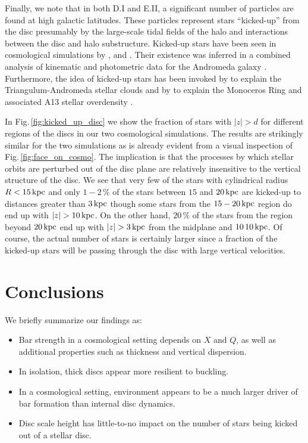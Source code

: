 Finally, we note that in both D.I and E.II, a significant number of
particles are found at high galactic latitudes.  These particles
represent stars ``kicked-up'' from the disc presumably by the
large-scale tidal fields of the halo and interactions between the disc
and halo substructure.  Kicked-up stars have been seen in cosmological
simulations by \citet{purcell2010}, \citet{mccarthy2012} and
\citet{tissera2013}.  Their existence was inferred in a combined
analysis of kinematic and photometric data for the Andromeda galaxy
\citep{dorman2013}.  Furthermore, the idea of kicked-up stars has been
invoked by \citep{pricewhelan2015} to explain the Triangulum-Andromeda
stellar clouds \citep{rochapinto2003, martin2014} and by
\citep{sheffield2018, laporte_2018_low_latitude} to explain the Monoceros Ring \citep{yanny2000,
  newberg_2002} and associated A13 stellar overdensity
\citep{sharma2010}.

In Fig.\,\ref{fig:kicked_up_disc} we show the fraction of stars with
$|z|>d$ for different regions of the discs in our two cosmological
simulations.  The results are strikingly similar for the two
simulations as is already evident from a visual inspection of 
Fig.\,\ref{fig:face_on_cosmo}. The implication is that
the processes by which stellar orbits are
perturbed out of the disc plane are relatively insensitive to the
vertical structure of the disc.  We see that very few of the stars
with cylindrical radius $R<15\,{\rm kpc}$ and only $1-2\,\%$ of the
stars between $15$ and $20\,{\rm kpc}$ are kicked-up to distances
greater than $3\,{\rm kpc}$ though some stars from the $15-20\,{\rm
  kpc}$ region do end up with $|z|> 10\,{\rm kpc}$.  On the other
hand, $20\,\%$ of the stars from the region beyond $20\,{\rm kpc}$ end
up with $|z|> 3\,{\rm kpc}$ from the midplane and $10\,%
10\,{\rm kpc}$.  Of course, the actual number of stars is certainly
larger since a fraction of the kicked-up stars will be passing through
the disc with large vertical velocities.

\section{Conclusions}\label{sec:conclusions}
{
We briefly summarize our findings as:
\begin{itemize}
\item Bar strength in a cosmological setting depends on $X$ and $Q$, as well as additional properties such as thickness and vertical dispersion.
\item In isolation, thick discs appear more resilient to buckling.
\item In a cosmological setting, environment appears to be a much larger driver of bar formation than internal disc dynamics.
\item Disc scale height has little-to-no impact on the number of stars being kicked out of a stellar disc.
\end{itemize}
}

